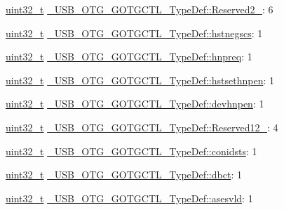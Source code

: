 \begin{DoxyCompactItemize}
\item 
\hyperlink{stdint_8h_a435d1572bf3f880d55459d9805097f62}{uint32\-\_\-t} \hyperlink{group___u_s_b___o_t_g___d_r_i_v_e_r_ga9821b352087a7b65db3080c50475eba8}{\-\_\-\-U\-S\-B\-\_\-\-O\-T\-G\-\_\-\-G\-O\-T\-G\-C\-T\-L\-\_\-\-Type\-Def\-::\-Reserved2\-\_}\-: 6
\item 
\hyperlink{stdint_8h_a435d1572bf3f880d55459d9805097f62}{uint32\-\_\-t} \hyperlink{group___u_s_b___o_t_g___d_r_i_v_e_r_gab946d22c3ce448cb5400c80a67741c7d}{\-\_\-\-U\-S\-B\-\_\-\-O\-T\-G\-\_\-\-G\-O\-T\-G\-C\-T\-L\-\_\-\-Type\-Def\-::hstnegscs}\-: 1
\item 
\hyperlink{stdint_8h_a435d1572bf3f880d55459d9805097f62}{uint32\-\_\-t} \hyperlink{group___u_s_b___o_t_g___d_r_i_v_e_r_gaf3e9c6ede6612d1d7229ccc6d201a595}{\-\_\-\-U\-S\-B\-\_\-\-O\-T\-G\-\_\-\-G\-O\-T\-G\-C\-T\-L\-\_\-\-Type\-Def\-::hnpreq}\-: 1
\item 
\hyperlink{stdint_8h_a435d1572bf3f880d55459d9805097f62}{uint32\-\_\-t} \hyperlink{group___u_s_b___o_t_g___d_r_i_v_e_r_gaf0bba72b67cdc4421da620a2206119bb}{\-\_\-\-U\-S\-B\-\_\-\-O\-T\-G\-\_\-\-G\-O\-T\-G\-C\-T\-L\-\_\-\-Type\-Def\-::hstsethnpen}\-: 1
\item 
\hyperlink{stdint_8h_a435d1572bf3f880d55459d9805097f62}{uint32\-\_\-t} \hyperlink{group___u_s_b___o_t_g___d_r_i_v_e_r_gac620352539abc5d73a05b0bbcde5d82b}{\-\_\-\-U\-S\-B\-\_\-\-O\-T\-G\-\_\-\-G\-O\-T\-G\-C\-T\-L\-\_\-\-Type\-Def\-::devhnpen}\-: 1
\item 
\hyperlink{stdint_8h_a435d1572bf3f880d55459d9805097f62}{uint32\-\_\-t} \hyperlink{group___u_s_b___o_t_g___d_r_i_v_e_r_gaf538e4adf72524cf22a00097b438703b}{\-\_\-\-U\-S\-B\-\_\-\-O\-T\-G\-\_\-\-G\-O\-T\-G\-C\-T\-L\-\_\-\-Type\-Def\-::\-Reserved12\-\_}\-: 4
\item 
\hyperlink{stdint_8h_a435d1572bf3f880d55459d9805097f62}{uint32\-\_\-t} \hyperlink{group___u_s_b___o_t_g___d_r_i_v_e_r_gaadfa38aac8be616468845b5ae918cd37}{\-\_\-\-U\-S\-B\-\_\-\-O\-T\-G\-\_\-\-G\-O\-T\-G\-C\-T\-L\-\_\-\-Type\-Def\-::conidsts}\-: 1
\item 
\hyperlink{stdint_8h_a435d1572bf3f880d55459d9805097f62}{uint32\-\_\-t} \hyperlink{group___u_s_b___o_t_g___d_r_i_v_e_r_gab4cc914b75de1112a34a92d317e116e2}{\-\_\-\-U\-S\-B\-\_\-\-O\-T\-G\-\_\-\-G\-O\-T\-G\-C\-T\-L\-\_\-\-Type\-Def\-::dbct}\-: 1
\item 
\hyperlink{stdint_8h_a435d1572bf3f880d55459d9805097f62}{uint32\-\_\-t} \hyperlink{group___u_s_b___o_t_g___d_r_i_v_e_r_gad7e69d077d4bafb6706e8ffab731a615}{\-\_\-\-U\-S\-B\-\_\-\-O\-T\-G\-\_\-\-G\-O\-T\-G\-C\-T\-L\-\_\-\-Type\-Def\-::asesvld}\-: 1

\end{DoxyCompactItemize}
